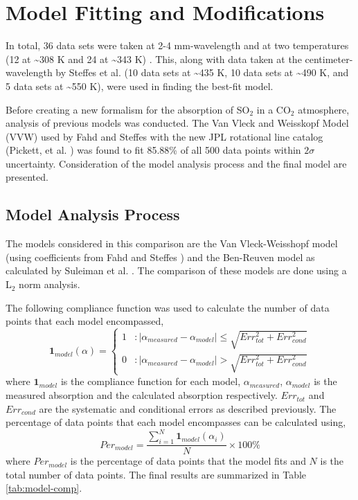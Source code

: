 \chapter{Model Fitting and Modifications}
In total, 36 data sets were taken at 2-4 mm-wavelength and at two temperatures (12 at \textasciitilde 308 K and 24 at \textasciitilde 343 K) . This, along with data taken at the centimeter-wavelength by Steffes et al. \cite{Steffes-2014} (10 data sets at \textasciitilde 435 K, 10 data sets at \textasciitilde 490 K, and 5 data sets at \textasciitilde 550 K), were used in finding the best-fit model.

Before creating a new formalism for the absorption of SO$_2$ in a CO$_2$ atmosphere, analysis of previous models was conducted. The Van Vleck and Weisskopf Model (VVW) used by Fahd and Steffes \cite{Fahd-1991} with the new JPL rotational line catalog (Pickett, et al. \cite{Pickett-1998}) was found to fit 85.88\% of all 500 data points within $2\sigma$ uncertainty. Consideration of the model analysis process and the final model are presented.


\section{Model Analysis Process}

The models considered in this comparison are the Van Vleck-Weisshopf model (using coefficients from Fahd and Steffes \cite{Fahd-1991}) and the Ben-Reuven model as calculated by Suleiman et al. \cite{Suleiman-1996}. The comparison of these models are done using a L$_2$ norm analysis. 

The following compliance function was used to calculate the number of data points that each model encompassed,
\begin{equation}
\textbf{1}_{model}(\alpha) = \left\{
     \begin{array}{lr}
       1 & : |\alpha_{measured} - \alpha_{model}| \leq \sqrt{Err_{tot}^2 + Err_{cond}^2 }\\
       0 & : |\alpha_{measured} - \alpha_{model}| > \sqrt{Err_{tot}^2 + Err_{cond}^2 }
     \end{array}
   \right.
\end{equation}
where $\textbf{1}_{model}$ is the compliance function for each model, $\alpha_{measured}$, $\alpha_{model}$ is the measured absorption and the calculated absorption respectively. $Err_{tot}$ and $Err_{cond}$ are the systematic and conditional errors as described previously. The percentage of data points that each model encompasses can be calculated using,
\begin{equation}
Per_{model} = \frac{\sum_{i=1}^N \textbf{1}_{model}(\alpha_i)}{N}\times 100\%
\end{equation}
where $Per_{model}$ is the percentage of data points that the model fits and $N$ is the total number of data points. The final results are summarized in Table \ref{tab:model-comp}.

